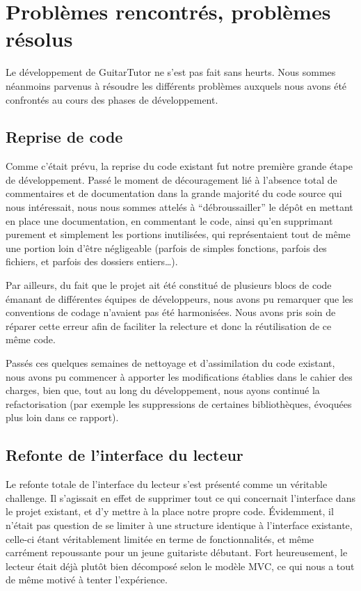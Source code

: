 \documentclass[a4paper,11pt]{article}
\begin{document}
\clearpage




\section{Problèmes rencontrés, problèmes résolus}

Le développement de GuitarTutor ne s'est pas fait sans heurts. Nous sommes néanmoins parvenus à résoudre les différents problèmes auxquels nous avons été confrontés au cours des phases de développement.

\subsection{Reprise de code}

Comme c'était prévu, la reprise du code existant fut notre première grande étape de développement. Passé le moment de découragement lié à l'absence total de commentaires et de documentation dans la grande majorité du code source qui nous intéressait, nous nous sommes attelés à ``débroussailler'' le dépôt en mettant en place une documentation, en commentant le code, ainsi qu'en supprimant purement et simplement les portions inutilisées, qui représentaient tout de même une portion loin d'être négligeable (parfois de simples fonctions, parfois des fichiers, et parfois des dossiers entiers\dots).

Par ailleurs, du fait que le projet ait été constitué de plusieurs blocs de code émanant de différentes équipes de développeurs, nous avons pu remarquer que les conventions de codage n'avaient pas été harmonisées. Nous avons pris soin de réparer cette erreur afin de faciliter la relecture et donc la réutilisation de ce même code.

Passés ces quelques semaines de nettoyage et d'assimilation du code existant, nous avons pu commencer à apporter les modifications établies dans le cahier des charges, bien que, tout au long du développement, nous ayons continué la refactorisation (par exemple les suppressions de certaines bibliothèques, évoquées plus loin dans ce rapport).

\subsection{Refonte de l'interface du lecteur}

Le refonte totale de l'interface du lecteur s'est présenté comme un véritable challenge. Il s'agissait en effet de supprimer tout ce qui concernait l'interface dans le projet existant, et d'y mettre à la place notre propre code. Évidemment, il n'était pas question de se limiter à une structure identique à l'interface existante, celle-ci étant véritablement limitée en terme de fonctionnalités, et m\^eme carrément repoussante pour un jeune guitariste débutant. Fort heureusement, le lecteur était déjà plut\^ot bien décomposé selon le modèle MVC, ce qui nous a tout de m\^eme motivé à tenter l'expérience.
\end{document}
